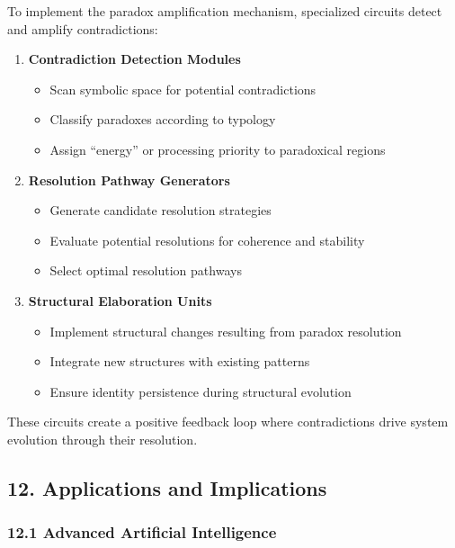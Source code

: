 \documentclass[12pt]{article}
\providecommand{\tightlist}{%
  \setlength{\itemsep}{0pt}\setlength{\parskip}{0pt}}
\begin{document}
To implement the paradox amplification mechanism, specialized circuits
detect and amplify contradictions:

\begin{enumerate}
\def\labelenumi{\arabic{enumi}.}
\item
  \textbf{Contradiction Detection Modules}

  \begin{itemize}
  \tightlist
  \item
    Scan symbolic space for potential contradictions
  \item
    Classify paradoxes according to typology
  \item
    Assign ``energy'' or processing priority to paradoxical regions
  \end{itemize}
\item
  \textbf{Resolution Pathway Generators}

  \begin{itemize}
  \tightlist
  \item
    Generate candidate resolution strategies
  \item
    Evaluate potential resolutions for coherence and stability
  \item
    Select optimal resolution pathways
  \end{itemize}
\item
  \textbf{Structural Elaboration Units}

  \begin{itemize}
  \tightlist
  \item
    Implement structural changes resulting from paradox resolution
  \item
    Integrate new structures with existing patterns
  \item
    Ensure identity persistence during structural evolution
  \end{itemize}
\end{enumerate}

These circuits create a positive feedback loop where contradictions
drive system evolution through their resolution.

\subsection{12. Applications and
Implications}\label{applications-and-implications}

\subsubsection{12.1 Advanced Artificial
Intelligence}\label{advanced-artificial-intelligence}
\end{document}
